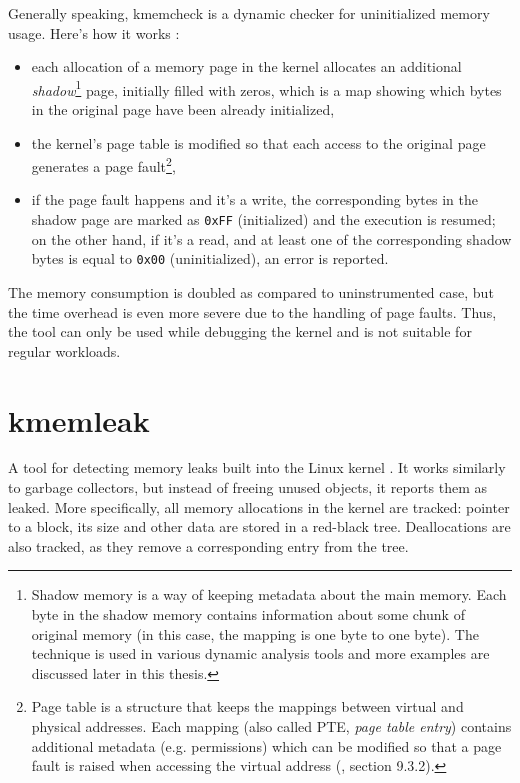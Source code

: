 \documentclass[shortabstract, manyadvisors, english, mgr]{iithesis}
\theoremstyle{definition} \newtheorem*{definition}{Definicja}
\theoremstyle{definition} \newtheorem*{example}{Przykład}
\theoremstyle{definition} \newtheorem*{remark}{Uwaga}
\begin{document}
Generally speaking, kmemcheck is a dynamic checker for uninitialized memory usage. Here's how it works \cite{bib:lwn-kmemcheck}:
\begin{itemize}
    \item each allocation of a memory page in the kernel allocates an additional \textit{shadow}\footnote{Shadow memory is a way of keeping metadata about the main memory. Each byte in the shadow memory contains information about some chunk of original memory (in this case, the mapping is one byte to one byte). The technique is used in various dynamic analysis tools and more examples are discussed later in this thesis.} page, initially filled with zeros, which is a map showing which bytes in the original page have been already initialized,
    \item the kernel's page table is modified so that each access to the original page generates a page fault\footnote{Page table is a structure that keeps the mappings between virtual and physical addresses. Each mapping (also called PTE, \textit{page table entry}) contains additional metadata (e.g. permissions) which can be modified so that a page fault is raised when accessing the virtual address (\cite{bib:csapp}, section 9.3.2).},
    \item if the page fault happens and it's a write, the corresponding bytes in the shadow page are marked as \texttt{0xFF} (initialized) and the execution is resumed; on the other hand, if it's a read, and at least one of the corresponding shadow bytes is equal to \texttt{0x00} (uninitialized), an error is reported.
\end{itemize}

The memory consumption is doubled as compared to uninstrumented case, but the time overhead is even more severe due to the handling of page faults. Thus, the tool can only be used while debugging the kernel and is not suitable for regular workloads.

\section{kmemleak}
A tool for detecting memory leaks built into the Linux kernel \cite{bib:kernel-org-memleak}. It works similarly to garbage collectors, but instead of freeing unused objects, it reports them as leaked. More specifically, all memory allocations in the kernel are tracked: pointer to a block, its size and other data are stored in a red-black tree. Deallocations are also tracked, as they remove a corresponding entry from the tree.
\end{document}

